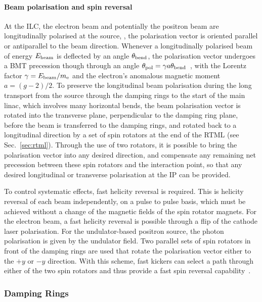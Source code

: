 \paragraph{Beam polarisation and spin reversal}
\label{par:beampol}

At the ILC, the electron beam and potentially the positron beam are longitudinally polarised at the source, \ie,  the polarisation vector is oriented parallel or antiparallel 
to the beam direction.
Whenever a longitudinally polarised beam of energy $E_{\mathrm{beam}}$ is deflected by an angle $\theta_{\mathrm{bend}}$, the polarisation vector undergoes a BMT precession though through an angle $\theta_{\mathrm{pol}} =  \gamma a \theta_{\mathrm{bend}}$~\cite{Moffeit:2005pb}, 
with the Lorentz factor $\gamma = E_{\mathrm{beam}}/m_{\mathrm{e}}$ and the electron's anomalous magnetic moment $a = (g-2)/2$. 
To preserve the longitudinal beam polarisation during the long transport from the source through the damping rings to the start of the main linac, which involves many horizontal bends, the beam polarisation vector is rotated into the transverse plane, perpendicular to the damping ring plane, before the beam is transferred to the damping rings, and rotated back to a longitudinal direction by a set of spin rotators at the end of the RTML (see Sec.~\ref{sec:rtml}).
Through the use of two rotators, it is possible to bring the polarisation vector into any desired direction, and compensate any remaining net precession between these spin rotators and the interaction point, so that any desired longitudinal or transverse polarisation at the IP can be provided.

To control systematic effects, fast helicity reversal is required.  This is helicity reversal of each beam independently, on a pulse to pulse basis, which must be achieved without a change of the magnetic fields of the spin rotator magnets.
For the electron beam, a fast helicity reversal is possible through a flip of the cathode laser polarisation.  For the undulator-based positron source, the photon polarisation is given by the undulator field.  Two parallel sets of spin rotators in front of the damping rings are used that rotate the polarisation vector either to the $+y$ or $-y$ direction.  With this scheme,
fast kickers can select a path through either of the two spin rotators and thus provide a fast spin reversal capability~\cite{Moffeit:2005pb,Malysheva:2016jdr}.




\subsubsection{Damping Rings}

